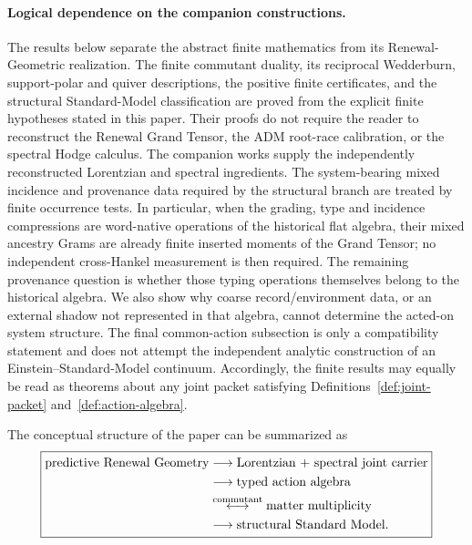 \documentclass[11pt]{article}
\theoremstyle{definition}
\theoremstyle{remark}
\begin{document}
\paragraph{Logical dependence on the companion constructions.}
The results below separate the abstract finite mathematics from its
Renewal-Geometric realization.  The finite commutant duality, its reciprocal
Wedderburn, support-polar and quiver descriptions, the positive finite
certificates, and the structural Standard-Model classification are proved from
the explicit finite hypotheses stated in this paper.  Their proofs do not
require the reader to reconstruct the Renewal Grand Tensor, the ADM root-race
calibration, or the spectral Hodge calculus.  The companion works
\cite{PelissierSpacetime2026,PelissierSpectral2026} supply the independently
reconstructed Lorentzian and spectral ingredients.  The system-bearing mixed
incidence and provenance data required by the structural branch are treated by
finite occurrence tests.  In particular, when the grading, type and incidence
compressions are word-native operations of the historical flat algebra, their
mixed ancestry Grams are already finite inserted moments of the Grand Tensor;
no independent cross-Hankel measurement is then required.  The remaining
provenance question is whether those typing operations themselves belong to the
historical algebra.  We also show why coarse record/environment data, or an
external shadow not represented in that algebra, cannot determine the acted-on
system structure.  The final common-action subsection is only a
compatibility statement and does not attempt the independent analytic
construction of an Einstein--Standard-Model continuum.  Accordingly, the
finite results may equally be read as theorems about any joint packet satisfying
Definitions~\ref{def:joint-packet} and~\ref{def:action-algebra}.

The conceptual structure of the paper can be summarized as
\begin{equation}
\boxed{
\begin{aligned}
\text{predictive Renewal Geometry}
&\longrightarrow
\text{Lorentzian + spectral joint carrier}\\
&\longrightarrow
\text{typed action algebra}\\
&\overset{\rm commutant}{\longleftrightarrow}
\text{matter multiplicity}\\
&\longrightarrow
\text{structural Standard Model}.
\end{aligned}}
\label{eq:intro-chain}
\end{equation}
\end{document}
